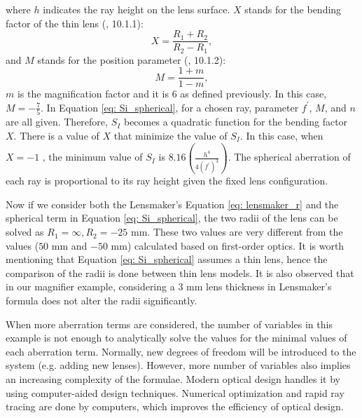 where $h$ indicates the ray height on the lens surface. $X$ stands for the bending factor of the thin lens (\cite{GrossHBOvol1}, 10.1.1):
\begin{equation} \label{eqn: bending factor}
X = \frac{R_1+R_2}{R_2-R_1},
\end{equation}and $M$ stands for the position parameter (\cite{GrossHBOvol1}, 10.1.2):
\begin{equation} \label{eqn: position parameter}
M = \frac{1+m}{1-m},
\end{equation}$m$ is the magnification factor and it is $6$ as defined previously. In this case, $M=-\frac{7}{5}$. In Equation \ref{eq: Si_spherical}, for a chosen ray, parameter $f^\prime$, $M$, and $n$ are all given. Therefore, $S_I$ becomes a quadratic function for the bending factor $X$. There is a value of $X$ that minimize the value of $S_I$. In this case, when $X = -1$ , the minimum value of $S_I $ is $ 8.16(\frac{h^4}{4(f^\prime)^3})$. The spherical aberration of each ray is proportional to its ray height given the fixed lens configuration. 

Now if we consider both the Lensmaker's Equation \ref{eq: lensmaker_r} and the spherical term in Equation \ref{eq: Si_spherical}, the two radii of the lens can be solved as $R_1 = \infty, R_2 = -25$ mm. These two values are very different from the values ($50$ mm and $-50$ mm) calculated based on first-order optics. It is worth mentioning that Equation \ref{eq: Si_spherical} assumes a thin lens, hence the comparison of the radii is done between thin lens models. It is also observed that in our magnifier example, considering a $3$ mm lens thickness in Lensmaker's formula does not alter the radii significantly.  

When more aberration terms are considered, the number of variables in this example is not enough to analytically solve the values for the minimal values of each aberration term. Normally, new degrees of freedom will be introduced to the system (e.g. adding new lenses). However, more number of variables also implies an increasing complexity of the formulae. Modern optical design handles it by using computer-aided design techniques. Numerical optimization and rapid ray tracing are done by computers, which improves the efficiency of optical design.  


